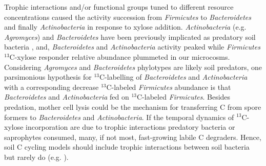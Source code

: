 Trophic interactions and/or functional groups tuned to different resource
concentrations caused the activity succession from \textit{Firmicutes} to
\textit{Bacteroidetes} and finally \textit{Actinobacteria} in response to
xylose addition. \textit{Actinobacteria} (e.g. \textit{Agromyces}) and
\textit{Bacteroidetes} have been previously implicated as predatory soil
bacteria \citep{Lueders2006,16346402}, and, \textit{Bacteroidetes} and
\textit{Actinobacteria} activity peaked while \textit{Firmicutes}
$^{13}$C-xylose responder relative abundance plummeted in our microcosms.
Considering \textit{Agromyces} and \textit{Bacteroidetes} phylotypes are likely
soil predators, one parsimonious hypothesis for $^{13}$C-labelling of
\textit{Bacteroidetes} and \textit{Actinobacteria} with a corresponding
decrease $^{13}$C-labeled \textit{Firmicutes} abundance is that
\textit{Bacteroidetes} and \textit{Actinobacteria} fed on $^{13}$C-labeled
\textit{Firmicutes}. Besides predation, mother cell lysis could be the
mechanism for transferring C from spore formers to \textit{Bacteroidetes} and
\textit{Actinobacteria}. If the temporal dynamics of $^{13}$C-xylose
incorporation are due to trophic interactions predatory bacteria or saprophytes
consumed, many, if not most, fast-growing labile C degraders. Hence, soil
C cycling models should include trophic interactions between soil bacteria but
rarely do (e.g. \citep{Moore1988}).

